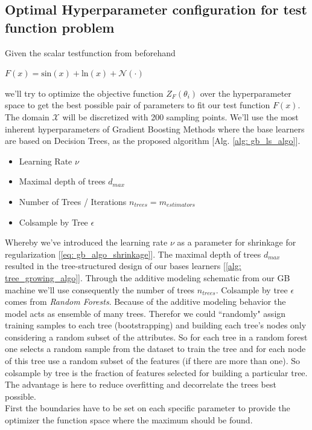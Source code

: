 \documentclass[12pt, a4paper]{article}
\begin{document}
\subsection{Optimal Hyperparameter configuration for test function problem}
\label{sec: bayesian_opt_test}
Given the scalar testfunction from beforehand
\begin{center}
    $F(x) = \text{sin}(x) + \text{ln}(x) + \mathcal{N}(\cdot)$
\end{center}
we'll try to optimize the objective function $Z_F(\theta_i)$ over the hyperparameter space to get the best possible pair of parameters to fit our test function $F(x)$. The domain $\mathcal{X}$ will be discretized with 200 sampling points. We'll use the most inherent hyperparameters of Gradient Boosting Methods where the base learners are based on Decision Trees, as the proposed algorithm [Alg. \ref{alg: gb_ls_algo}].
\begin{itemize}
    \item Learning Rate $\nu$
    \item Maximal depth of trees $d_{max}$
    \item Number of Trees / Iterations $n_{trees} = m_{estimators}$
    \item Colsample by Tree $\epsilon$
\end{itemize}
Whereby we've introduced the learning rate $\nu$ as a parameter for shrinkage for regularization [\ref{eq: gb_algo_shrinkage}]. The maximal depth of trees $d_{max}$ resulted in the tree-structured design of our bases learners [\ref{alg: tree_growing_algo}]. Through the additive modeling schematic from our GB machine we'll use consequently the number of trees $n_{trees}$. Colsample by tree $\epsilon$ comes from \textit{Random Forests}. Because of the additive modeling behavior the model acts as ensemble of many trees. Therefor we could ``randomly" assign training samples to each tree (bootstrapping) and building each tree's nodes only considering a random subset of the attributes. So for each tree in a random forest one selects a random sample from the dataset to train the tree and for each node of this tree use a random subset of the features (if there are more than one).
So colsample by tree is the fraction of features selected for building a particular tree. The advantage is here to reduce overfitting and decorrelate the trees best possible.  \\
First the boundaries have to be set on each specific parameter to provide the optimizer the function space where the maximum should be found.
\end{document}
